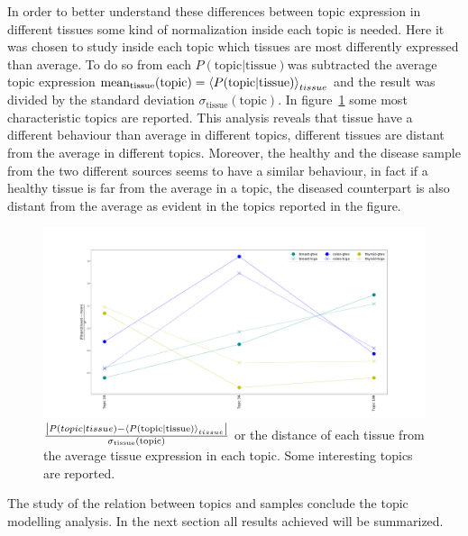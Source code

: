 In order to better understand these differences between topic expression in different tissues some kind of normalization inside each topic is needed. Here it was chosen to study inside each topic which tissues are most differently expressed than average. To do so from each $P(\text{topic}| \text{tissue})$was subtracted the average topic expression $\text{mean}_{\text{tissue}}(\text{topic})=\left\langle P(\text{topic}| \text{tissue})\right\rangle_{tissue}$ and the result was divided by the standard deviation $\sigma_{\text{tissue}}(\text{topic})$. In figure~\ref{fig:topic/merged/lifeplot_normalised_level3_hd} some most characteristic topics are reported. This analysis reveals that tissue have a different behaviour than average in different topics, different tissues are distant from the average in different topics. Moreover, the healthy and the disease sample from the two different sources seems to have a similar behaviour, in fact if a healthy tissue is far from the average in a topic, the diseased counterpart is also distant from the average as evident in the topics reported in the figure.
\begin{figure}[htb!]
	\centering
	\includegraphics[width=0.8\linewidth]{pictures/topic/merged/lifeplot_normalised_level3_hd.pdf}
	\caption{$\frac{\left|P(topic | tissue) - \left\langle P(\text{topic}| \text{tissue})\right\rangle_{tissue}\right|}{\sigma_{\text{tissue}}(\text{topic})}$ or the distance of each tissue from the average tissue expression in each topic. Some interesting topics are reported.}
	\label{fig:topic/merged/lifeplot_normalised_level3_hd}
\end{figure}

The study of the relation between topics and samples conclude the topic modelling analysis. In the next section all results achieved will be summarized.